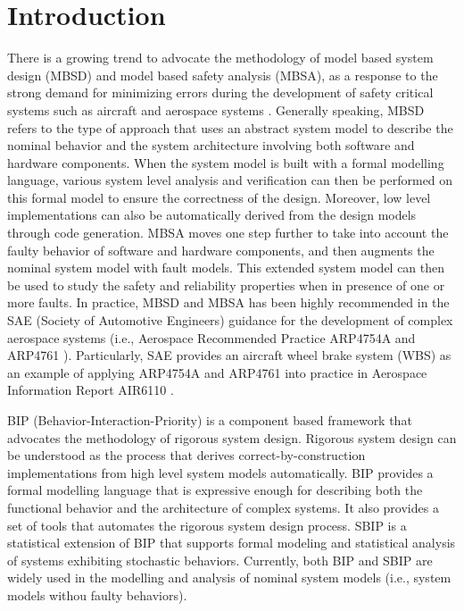 
\section{Introduction}

There is a growing trend to advocate the methodology of model based system design (MBSD) and model based safety analysis (MBSA),
 as a response to the strong demand for minimizing errors during the development of safety critical systems such as aircraft and aerospace systems \cite{lctes10,issrew12}.
 Generally speaking,  MBSD refers to the type of approach 
 that uses an abstract system model to describe the nominal behavior and the system architecture involving both software and hardware components.
 When the system model is built with a formal modelling language, various system level analysis and verification can then be performed on this formal model to ensure the correctness of the design.
 Moreover, low level implementations can also be automatically derived from the design models through code generation.
 MBSA moves one step further to take into account the faulty behavior of software and hardware components,
 and then augments the nominal system model with fault models.
 This extended system model can then be used to study the safety and reliability properties when in presence of one or more faults.
% 
 In practice, MBSD and MBSA has been highly recommended in the SAE (Society of Automotive Engineers) guidance for the development of complex aerospace systems 
  (i.e., Aerospace Recommended Practice ARP4754A \cite{arp4754a} and ARP4761 \cite{arp4761}).
  Particularly, SAE provides an aircraft wheel brake system (WBS) as an example of applying ARP4754A and ARP4761 into practice 
  in Aerospace Information Report AIR6110 \cite{air6110}.


BIP (Behavior-Interaction-Priority) \cite{bip1,bip2} is a component based framework that advocates the methodology of rigorous system design.
 Rigorous system design can be understood as the process that derives correct-by-construction implementations from high level system models automatically.
 BIP provides a formal modelling language that is expressive enough for describing both the functional behavior and the architecture of complex systems.
 It also provides a set of tools that automates the rigorous system design process.
 SBIP \cite{sbip18} is a statistical extension of BIP that supports formal modeling and statistical analysis of systems exhibiting stochastic behaviors.
 Currently, both BIP and SBIP are widely used in the modelling and analysis of nominal system models (i.e., system models withou faulty behaviors).


